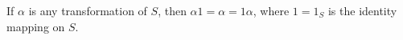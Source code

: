 If $\alpha$ is any transformation of $S$, then $\alpha 1 = \alpha = 1\alpha$, where $1 = 1_S$ is the identity mapping on $S$.
